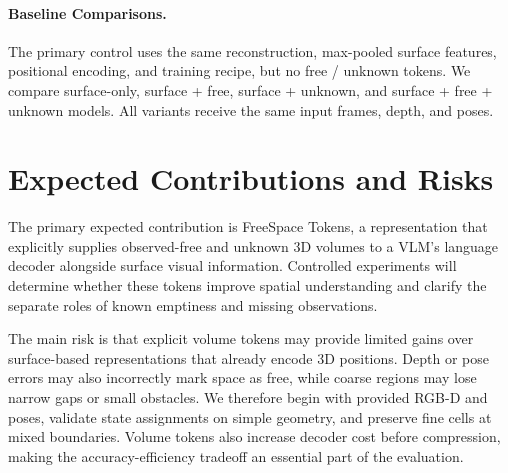 \documentclass[10pt,twocolumn,letterpaper]{article}
\begin{document}
\paragraph{Baseline Comparisons.}
The primary control uses the same reconstruction, max-pooled surface features, positional encoding, and training recipe, but no free / unknown tokens. We compare surface-only, surface + free, surface + unknown, and surface + free + unknown models. All variants receive the same input frames, depth, and poses.

\section{Expected Contributions and Risks}

The primary expected contribution is FreeSpace Tokens, a representation that explicitly supplies observed-free and unknown 3D volumes to a VLM's language decoder alongside surface visual information. Controlled experiments will determine whether these tokens improve spatial understanding and clarify the separate roles of known emptiness and missing observations. 

The main risk is that explicit volume tokens may provide limited gains over surface-based representations that already encode 3D positions. Depth or pose errors may also incorrectly mark space as free, while coarse regions may lose narrow gaps or small obstacles. We therefore begin with provided RGB-D and poses, validate state assignments on simple geometry, and preserve fine cells at mixed boundaries. Volume tokens also increase decoder cost before compression, making the accuracy-efficiency tradeoff an essential part of the evaluation.
\end{document}

